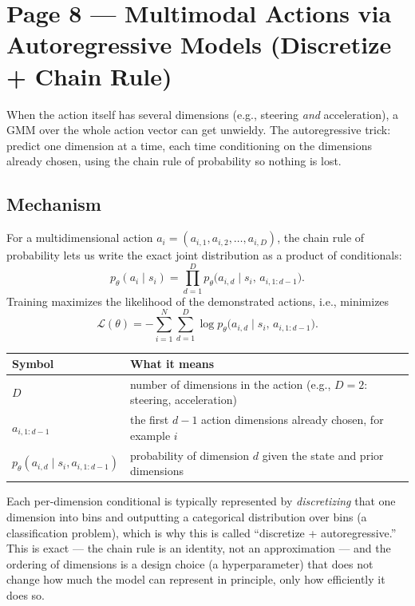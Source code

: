 \documentclass[11pt]{article}
\begin{document}
\section*{Page 8 --- Multimodal Actions via Autoregressive Models (Discretize + Chain Rule)}

When the action itself has several dimensions (e.g., steering \emph{and} acceleration), a GMM over the whole action vector can get unwieldy. The autoregressive trick: predict one dimension at a time, each time conditioning on the dimensions already chosen, using the chain rule of probability so nothing is lost.

\subsection*{Mechanism}

For a multidimensional action $a_i = (a_{i,1}, a_{i,2}, \dots, a_{i,D})$, the chain rule of probability lets us write the exact joint distribution as a product of conditionals:
\[
p_\theta(a_i \mid s_i) = \prod_{d=1}^{D} p_\theta\big(a_{i,d} \mid s_i,\, a_{i,1:d-1}\big).
\]
Training maximizes the likelihood of the demonstrated actions, i.e., minimizes
\[
\mathcal{L}(\theta) = -\sum_{i=1}^{N} \sum_{d=1}^{D} \log p_\theta\big(a_{i,d} \mid s_i,\, a_{i,1:d-1}\big).
\]

\begin{center}
\begin{tabular}{@{}ll@{}}
\toprule
Symbol & What it means \\
\midrule
$D$ & number of dimensions in the action (e.g., $D=2$: steering, acceleration) \\
$a_{i,1:d-1}$ & the first $d-1$ action dimensions already chosen, for example $i$ \\
$p_\theta(a_{i,d}\mid s_i, a_{i,1:d-1})$ & probability of dimension $d$ given the state and prior dimensions \\
\bottomrule
\end{tabular}
\end{center}

Each per-dimension conditional is typically represented by \emph{discretizing} that one dimension into bins and outputting a categorical distribution over bins (a classification problem), which is why this is called ``discretize + autoregressive.'' This is exact --- the chain rule is an identity, not an approximation --- and the ordering of dimensions is a design choice (a hyperparameter) that does not change how much the model can represent in principle, only how efficiently it does so.
\end{document}
